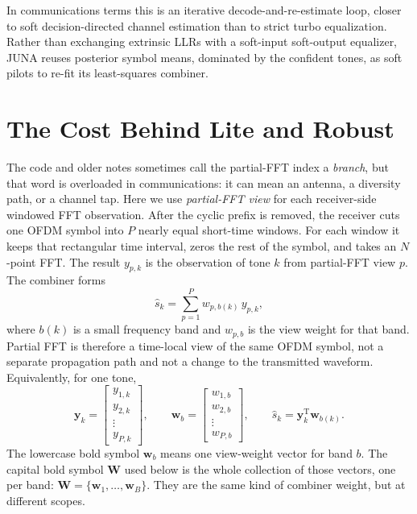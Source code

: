 \documentclass[11pt]{article}
\newcommand{\juna}{JUNA}
\begin{document}
In communications terms this is an iterative decode-and-re-estimate loop,
closer to soft decision-directed channel estimation than to strict turbo
equalization. Rather than exchanging extrinsic LLRs with a soft-input
soft-output equalizer, \juna{} reuses posterior symbol means, dominated by the
confident tones, as soft pilots to re-fit its least-squares combiner.

\section{The Cost Behind Lite and Robust}

The code and older notes sometimes call the partial-FFT index a
\emph{branch}, but that word is overloaded in communications: it can mean an
antenna, a diversity path, or a channel tap. Here we use
\emph{partial-FFT view} for each receiver-side windowed FFT observation. After
the cyclic prefix is removed, the receiver cuts one OFDM symbol into \(P\)
nearly equal short-time windows. For each window it keeps that rectangular time
interval, zeros the rest of the symbol, and takes an \(N\)-point FFT. The result
\(y_{p,k}\) is the observation of tone \(k\) from partial-FFT view \(p\). The
combiner forms
\begin{equation}
  \hat{s}_k = \sum_{p=1}^{P} w_{p,b(k)}\,y_{p,k},
\end{equation}
where \(b(k)\) is a small frequency band and \(w_{p,b}\) is the view weight for
that band. Partial FFT is therefore a time-local view of the same OFDM symbol,
not a separate propagation path and not a change to the transmitted waveform.
Equivalently, for one tone,
\begin{equation}
  \mathbf y_k =
  \begin{bmatrix}
    y_{1,k}\\
    y_{2,k}\\
    \vdots\\
    y_{P,k}
  \end{bmatrix},
  \qquad
  \mathbf w_b =
  \begin{bmatrix}
    w_{1,b}\\
    w_{2,b}\\
    \vdots\\
    w_{P,b}
  \end{bmatrix},
  \qquad
  \hat{s}_k=\mathbf y_k^{\mathrm T}\mathbf w_{b(k)} .
\end{equation}
The lowercase bold symbol \(\mathbf w_b\) means one view-weight vector for band
\(b\). The capital bold symbol \(\mathbf W\) used below is the whole collection
of those vectors, one per band:
\(\mathbf W=\{\mathbf w_1,\ldots,\mathbf w_B\}\). They are the same kind of
combiner weight, but at different scopes.
\end{document}
